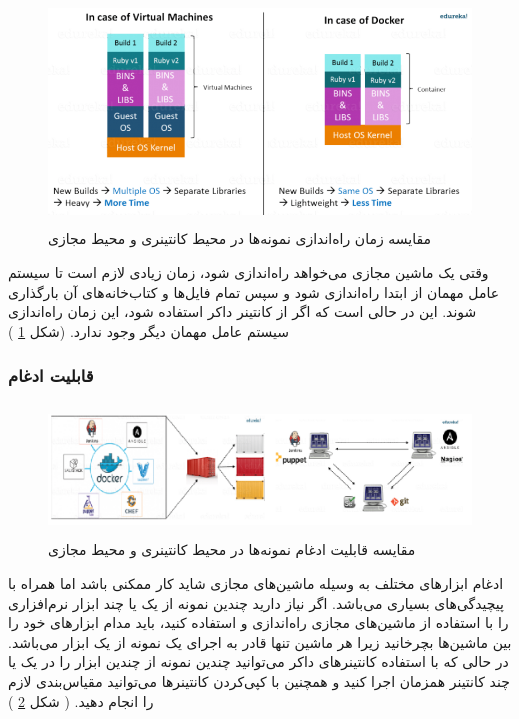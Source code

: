 \begin{figure}[!h]
	\centering
	\includegraphics[height=6cm]{fig2-3}
	\caption{مقایسه زمان راه‌اندازی نمونه‌ها در محیط کانتینری و محیط مجازی}
	\label{تصویر 2-3}
\end{figure}

وقتی یک ماشین مجازی می‌خواهد راه‌اندازی شود، زمان زیادی لازم است تا سیستم عامل مهمان از ابتدا راه‌اندازی شود و سپس تمام فایل‌ها و کتاب‌خانه‌های آن بارگذاری شوند. این در حالی است که اگر از کانتینر داکر استفاده شود، این زمان راه‌اندازی سیستم عامل مهمان دیگر وجود ندارد. (شکل
\ref{تصویر 2-3}
)

\subsubsection*{قابلیت ادغام}

\begin{figure}[!h]
	\centering
	\includegraphics[height=3.5cm]{fig2-4}
	\caption{مقایسه قابلیت ادغام نمونه‌ها در محیط کانتینری و محیط مجازی}
	\label{تصویر 2-4}
\end{figure}

ادغام ابزارهای مختلف به وسیله ماشین‌های مجازی شاید کار ممکنی باشد اما همراه با پیچیدگی‌های بسیاری می‌باشد. اگر نیاز دارید چندین نمونه از یک یا چند ابزار نرم‌افزاری را با استفاده از ماشین‌های مجازی راه‌اندازی و استفاده کنید، باید مدام ابزارهای خود را بین ماشین‌ها بچرخانید زیرا هر ماشین تنها قادر به اجرای یک نمونه از یک ابزار می‌باشد. در حالی که با استفاده کانتینرهای داکر می‌توانید چندین نمونه از چندین ابزار را در یک یا چند کانتینر همزمان اجرا کنید و همچنین با کپی‌کردن کانتینرها می‌توانید مقیاس‌بندی لازم را انجام دهید. ( شکل 
\ref{تصویر 2-4}
)


